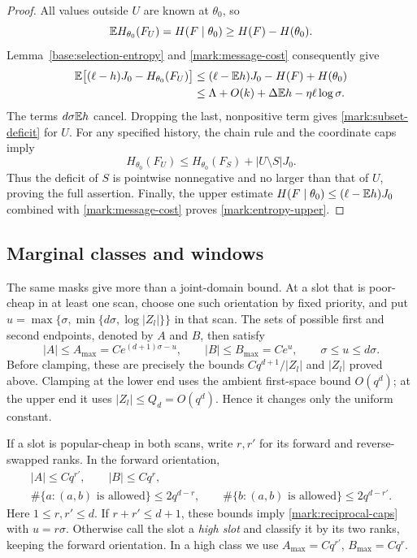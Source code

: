 \begin{proof}
All values outside $U$ are known at $\theta_0$, so
\[
 \mathbb E H_{\theta_0}(F_U)=H(F\mid\theta_0)
                    \ge H(F)-H(\theta_0).
\]
Lemma~\ref{base:selection-entropy} and
\eqref{mark:message-cost} consequently give
\begin{align*}
 \mathbb E\bigl[(\ell-h)J_0-H_{\theta_0}(F_U)\bigr]
 &\le (\ell-\mathbb E h)J_0-H(F)+H(\theta_0)\\
 &\le \Lambda+O(k)+\Delta\mathbb E h-\eta\ell\log\sigma.
\end{align*}
The terms $d\sigma\mathbb E h$ cancel. Dropping the last, nonpositive term
gives \eqref{mark:subset-deficit} for $U$. For any specified history,
the chain rule and the coordinate caps imply
\[
 H_{\theta_0}(F_U)
 \le H_{\theta_0}(F_S)+|U\setminus S|J_0.
\]
Thus the deficit of $S$ is pointwise nonnegative and no larger than
that of $U$, proving the full assertion. Finally, the upper estimate
$H(F\mid\theta_0)\le(\ell-\mathbb E h)J_0$ combined with
\eqref{mark:message-cost} proves \eqref{mark:entropy-upper}.
\end{proof}

\subsection{Marginal classes and windows}

The same masks give more than a joint-domain bound. At a slot that is
poor-cheap in at least one scan, choose one such orientation by fixed
priority, and put
$u=\max\{\sigma,\min\{d\sigma,\log|Z_l|\}\}$ in that scan.
The sets of possible first and second endpoints, denoted by $A$ and
$B$, then satisfy
\begin{equation}\label{mark:reciprocal-caps}
 |A|\le A_{\max}=C e^{(d+1)\sigma-u},\qquad
 |B|\le B_{\max}=C e^u,\qquad \sigma\le u\le d\sigma.
\end{equation}
Before clamping, these are precisely the bounds
$Cq^{d+1}/|Z_l|$ and $|Z_l|$ proved above. Clamping at the lower end
uses the ambient first-space bound $O(q^d)$; at the upper end it uses
$|Z_l|\le Q_d=O(q^d)$. Hence it changes only the uniform constant.

If a slot is popular-cheap in both scans, write $r,r'$ for its forward
and reverse-swapped ranks. In the forward orientation,
\begin{equation}\label{mark:high-caps}
 \begin{gathered}
 |A|\le Cq^{r'},\qquad |B|\le Cq^r,\\
 \#\{a:(a,b)\text{ is allowed}\}\le2q^{d-r},\qquad
 \#\{b:(a,b)\text{ is allowed}\}\le2q^{d-r'}.
 \end{gathered}
\end{equation}
Here $1\le r,r'\le d$. If $r+r'\le d+1$, these bounds imply
\eqref{mark:reciprocal-caps} with $u=r\sigma$. Otherwise call the
slot a \emph{high slot} and classify it by its two ranks, keeping the
forward orientation. In a high class we use
$A_{\max}=Cq^{r'}$, $B_{\max}=Cq^r$.

